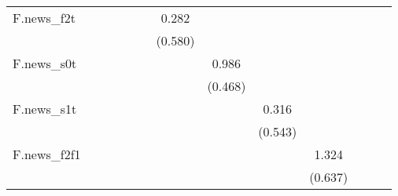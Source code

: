 {\begin{tabular}{l*{12}{c}}
\addlinespace
F.news\_f2t  &                     &                     &                     &                     &                     &       0.282         &                     &                     &                     &                     &                     &                     \\
            &                     &                     &                     &                     &                     &     (0.580)         &                     &                     &                     &                     &                     &                     \\
\addlinespace
F.news\_s0t  &                     &                     &                     &                     &                     &                     &       0.986\sym{*}  &                     &                     &                     &                     &                     \\
            &                     &                     &                     &                     &                     &                     &     (0.468)         &                     &                     &                     &                     &                     \\
\addlinespace
F.news\_s1t  &                     &                     &                     &                     &                     &                     &                     &       0.316         &                     &                     &                     &                     \\
            &                     &                     &                     &                     &                     &                     &                     &     (0.543)         &                     &                     &                     &                     \\
\addlinespace
F.news\_f2f1 &                     &                     &                     &                     &                     &                     &                     &                     &       1.324\sym{*}  &                     &                     &                     \\
            &                     &                     &                     &                     &                     &                     &                     &                     &     (0.637)         &                     &                     &                     \\

\end{tabular}}
